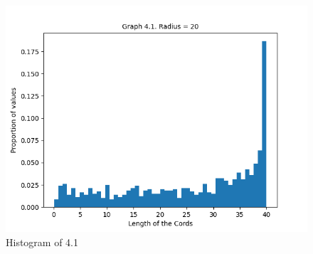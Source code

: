 \documentclass[answers]{exam}
\begin{document}
    
    \begin{figure}[ht]
        \caption{Histogram of 4.1}
        \centering
        \includegraphics[scale=0.7]{Q4/Q4(1).png}
    \end{figure}
\newpage
\end{document}
